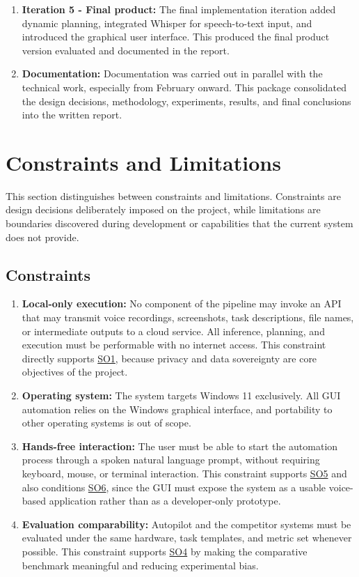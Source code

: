 \begin{enumerate}
  \item \textbf{Iteration 5 - Final product:} The final implementation iteration added dynamic planning, integrated Whisper for speech-to-text input, and introduced the graphical user interface. This produced the final product version evaluated and documented in the report.

  \item \textbf{Documentation:} Documentation was carried out in parallel with the technical work, especially from February onward. This package consolidated the design decisions, methodology, experiments, results, and final conclusions into the written report.
\end{enumerate}


\section{Constraints and Limitations}
\label{sec:constraints}

This section distinguishes between constraints and limitations. Constraints are design decisions deliberately imposed on the project, while limitations are boundaries discovered during development or capabilities that the current system does not provide.

\subsection{Constraints}

\begin{enumerate}
  \item \textbf{Local-only execution:} No component of the pipeline may invoke an API that may transmit voice recordings, screenshots, task descriptions, file names, or intermediate outputs to a cloud service. All inference, planning, and execution must be performable with no internet access. This constraint directly supports \hyperref[so:1]{SO1}, because privacy and data sovereignty are core objectives of the project.

  \item \textbf{Operating system:} The system targets Windows 11 exclusively. All GUI automation relies on the Windows graphical interface, and portability to other operating systems is out of scope.

  \item \textbf{Hands-free interaction:} The user must be able to start the automation process through a spoken natural language prompt, without requiring keyboard, mouse, or terminal interaction. This constraint supports \hyperref[so:5]{SO5} and also conditions \hyperref[so:6]{SO6}, since the GUI must expose the system as a usable voice-based application rather than as a developer-only prototype.

  \item \textbf{Evaluation comparability:} Autopilot and the competitor systems must be evaluated under the same hardware, task templates, and metric set whenever possible. This constraint supports \hyperref[so:4]{SO4} by making the comparative benchmark meaningful and reducing experimental bias.
\end{enumerate}

